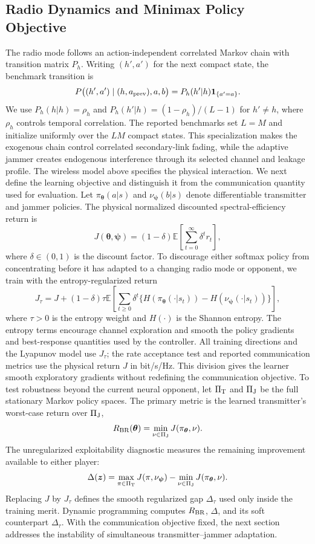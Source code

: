 \documentclass[conference]{IEEEtran}
\newcommand{\bz}{\bm{z}}
\newcommand{\btheta}{\bm{\theta}}
\newcommand{\bpsi}{\bm{\psi}}
\newcommand{\E}{\mathbb{E}}
\begin{document}
\subsection{Radio Dynamics and Minimax Policy Objective}
The radio mode follows an action-independent correlated Markov chain with transition matrix $P_h$.
Writing $(h',a')$ for the next compact state, the benchmark transition is
\[
P\big((h',a')\mid(h,a_{\rm prev}),a,b\big)
=P_h(h'|h)\mathbf 1_{\{a'=a\}}.
\]
We use $P_h(h|h)=\rho_h$ and $P_h(h'|h)=(1-\rho_h)/(L-1)$ for $h'\ne h$, where $\rho_h$ controls temporal correlation.
The reported benchmarks set $L=M$ and initialize uniformly over the $LM$ compact states.
This specialization makes the exogenous chain control correlated secondary-link fading, while the adaptive jammer creates endogenous interference through its selected channel and leakage profile.
The wireless model above specifies the physical interaction.
We next define the learning objective and distinguish it from the communication quantity used for evaluation.
Let $\pi_{\btheta}(a|s)$ and $\nu_{\bpsi}(b|s)$ denote differentiable transmitter and jammer policies.
The physical normalized discounted spectral-efficiency return is
\[
J(\btheta,\bpsi)=(1-\delta)\E\!\left[\sum_{t=0}^{\infty}\delta^t r_t\right],
\]
where $\delta\in(0,1)$ is the discount factor.
To discourage either softmax policy from concentrating before it has adapted to a changing radio mode or opponent, we train with the entropy-regularized return
\[
J_\tau=J+(1-\delta)\tau\E\!\left[\sum_{t\geq0}\delta^t\{H(\pi_{\btheta}(\cdot|s_t))-H(\nu_{\bpsi}(\cdot|s_t))\}\right],
\]
where $\tau>0$ is the entropy weight and $H(\cdot)$ is the Shannon entropy.
The entropy terms encourage channel exploration and smooth the policy gradients and best-response quantities used by the controller.
All training directions and the Lyapunov model use $J_\tau$; the rate acceptance test and reported communication metrics use the physical return $J$ in bit/s/Hz.
This division gives the learner smooth exploratory gradients without redefining the communication objective.
To test robustness beyond the current neural opponent, let $\Pi_{\rm T}$ and $\Pi_{\rm J}$ be the full stationary Markov policy spaces.
The primary metric is the learned transmitter's worst-case return over $\Pi_{\rm J}$,
\[
R_{\rm BR}(\btheta)=\min_{\nu\in\Pi_{\rm J}}J(\pi_{\btheta},\nu).
\]
The unregularized exploitability diagnostic measures the remaining improvement available to either player:
\[
\Delta(\bz)=\max_{\pi\in\Pi_{\rm T}}J(\pi,\nu_{\bpsi})-\min_{\nu\in\Pi_{\rm J}}J(\pi_{\btheta},\nu).
\]
Replacing $J$ by $J_\tau$ defines the smooth regularized gap $\Delta_\tau$ used only inside the training merit.
Dynamic programming computes $R_{\rm BR}$, $\Delta$, and its soft counterpart $\Delta_\tau$.
With the communication objective fixed, the next section addresses the instability of simultaneous transmitter--jammer adaptation.
\end{document}
